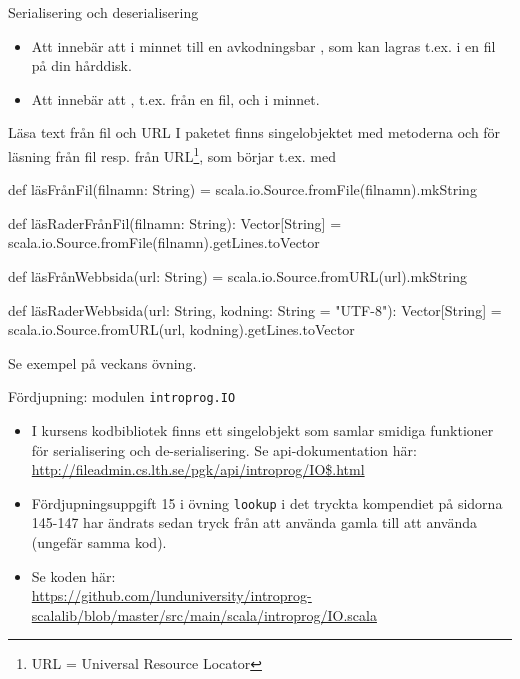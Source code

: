 


\begin{Slide}{Serialisering och deserialisering}
\begin{itemize}
  \item Att  innebär att  i minnet till en avkodningsbar , som kan lagras t.ex. i en fil på din hårddisk.
  \item Att  innebär att , t.ex. från en fil, och  i minnet.
\end{itemize}
\end{Slide}


\begin{Slide}{Läsa text från fil och URL}
I paketet  finns singelobjektet  med metoderna  och  för läsning från fil resp. från  URL\footnote{URL = Universal Resource Locator}, som börjar t.ex. med 
\begin{Code}
def läsFrånFil(filnamn: String) = scala.io.Source.fromFile(filnamn).mkString

def läsRaderFrånFil(filnamn: String): Vector[String] =
  scala.io.Source.fromFile(filnamn).getLines.toVector

def läsFrånWebbsida(url: String) = scala.io.Source.fromURL(url).mkString

def läsRaderWebbsida(url: String, kodning: String = "UTF-8"): Vector[String] =
  scala.io.Source.fromURL(url, kodning).getLines.toVector

\end{Code}
Se exempel på veckans övning.
\end{Slide}


\begin{Slide}{Fördjupning: modulen \texttt{introprog.IO}}
  \begin{itemize}
    \item I kursens kodbibliotek  finns ett singelobjekt  som samlar smidiga funktioner för serialisering och de-serialisering. Se api-dokumentation här: \\ \url{http://fileadmin.cs.lth.se/pgk/api/introprog/IO$.html}
    \item
    Fördjupningsuppgift 15 i övning \texttt{lookup} i det tryckta kompendiet på sidorna 145-147 har ändrats sedan tryck från att använda gamla  till att använda  (ungefär samma kod).
    \item Se koden här:\\
    \url{https://github.com/lunduniversity/introprog-scalalib/blob/master/src/main/scala/introprog/IO.scala}
  \end{itemize}
\end{Slide}

